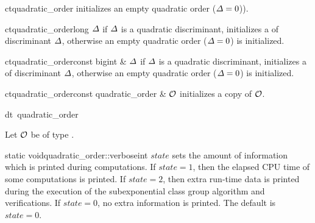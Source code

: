 
\CONS

\begin{fcode}{ct}{quadratic_order}{}
    initializes an empty quadratic order ($\varDelta = 0$)).
\end{fcode}

\begin{fcode}{ct}{quadratic_order}{long $\varDelta$}
  if $\varDelta$ is a quadratic discriminant, initializes a  of discriminant
  $\varDelta$, otherwise an empty quadratic order ($\varDelta = 0$) is initialized.
\end{fcode}

\begin{fcode}{ct}{quadratic_order}{const bigint & $\varDelta$}
  if $\varDelta$ is a quadratic discriminant, initializes a  of discriminant
  $\varDelta$, otherwise an empty quadratic order ($\varDelta = 0$) is initialized.
\end{fcode}

\begin{fcode}{ct}{quadratic_order}{const quadratic_order & $\mathcal{O}$}
  initializes a copy of $\mathcal{O}$.
\end{fcode}

\begin{fcode}{dt}{~quadratic_order}{}
\end{fcode}



\INIT

Let $\mathcal{O}$ be of type .

\begin{fcode}{static void}{quadratic_order::verbose}{int $\mathit{state}$}
  sets the amount of information which is printed during computations.  If $\mathit{state} = 1$,
  then the elapsed CPU time of some computations is printed.  If $\mathit{state} = 2$, then
  extra run-time data is printed during the execution of the subexponential class group
  algorithm and verifications.  If $\mathit{state} = 0$, no extra information is printed.  The
  default is $\mathit{state} = 0$.
\end{fcode}

